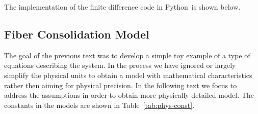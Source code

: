 \documentclass[twoside,a4paper,12pt]{article}
\newcommand{\tabref}[1]{Table~\ref{#1}}
\newcommand{\prog}[1]{\textsf{#1}}
\newcommand{\python}{\prog{Python}}
\begin{document}
The implementation of the finite difference code in \python\ is shown
below.
%


\subsection{Fiber Consolidation Model}

The goal of the previous text was to develop a simple toy example of a
type of equations describing the system. In the process we have ignored
or largely simplify the physical units to obtain a model with
mathematical characteristics rather then aiming for physical
precision. In the following text we focus to address the assumptions
in order to obtain more physically detailed model. The constants in the
models are shown in \tabref{tab:phys-const}.
\end{document}
